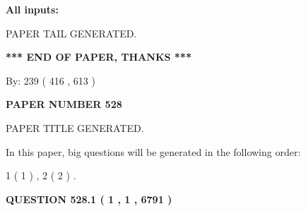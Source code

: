 \documentclass[12pt]{article}
\begin{document}
   
   
   
\noindent{}
   
   
   
   
\noindent\vspace{0.1in}\hspace{-0.08in} {\textbf{\Large{All inputs: }}}
   
   
   
   
   
   
 \vspace{0.2in}
 
   
   
\vspace{2.0in} PAPER TAIL GENERATED.
   
   
   
   
\vspace{1.0in} 
{\textbf{\large{ *** END OF PAPER, THANKS *** }}} 
   
   
\hspace{1.0in} By: 
 239 ( 416 ,  613 )
   
   
   
   
\newpage 
\setcounter{page}{ 
   528001 } 
   
   
   
   
 {\textbf{ \Large{ PAPER NUMBER  528  }}}
   
   
\vspace{0.2in}
   
   
   
   
   
   
   
   
 \vspace{0.2in}
 
 
 
 
   
   
 PAPER TITLE GENERATED.
   
   
   
\vspace{0.2in}
   
In this paper, big questions will be generated in the following order: 
   
   
   1 ( 1 )
 ,
   2 ( 2 )
 .
  
\vspace{0.2in}
  
{\textbf{\Large{QUESTION
528.1 
 ( 1 , 1 , 6791 )
}}}
  
\end{document}
